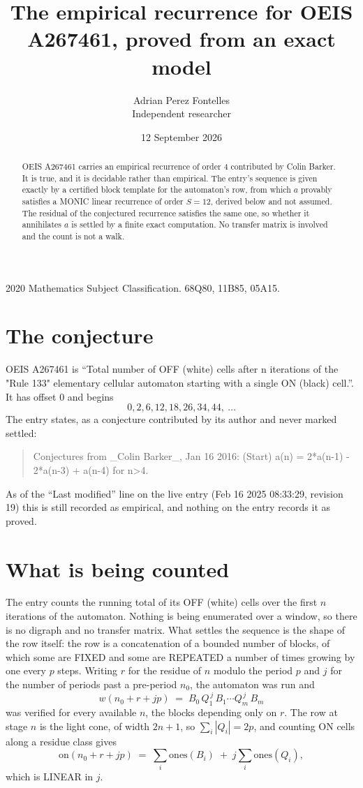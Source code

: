 \documentclass[11pt,a4paper]{article}
\title{The empirical recurrence for OEIS A267461, proved from an exact model}
\author{Adrian Perez Fontelles\\ \small Independent researcher}
\date{12 September 2026}
\theoremstyle{plain}
\theoremstyle{definition}
\begin{document}
\maketitle

\begin{abstract}
OEIS A267461 carries an empirical recurrence of order $4$ contributed by Colin Barker. It is true, and it is
decidable rather than empirical. The entry's sequence is given exactly by a certified block template for the automaton's row, from
which $a$ provably satisfies a MONIC linear recurrence of order $S=12$, derived below and not
assumed. The residual of the conjectured recurrence satisfies the same one, so whether it
annihilates $a$ is settled by a finite exact computation. No transfer matrix is involved and
the count is not a walk.
\end{abstract}

\noindent\small 2020 Mathematics Subject Classification. 68Q80, 11B85, 05A15.\normalsize

\section{The conjecture}

OEIS A267461 is ``Total number of OFF (white) cells after n iterations of the "Rule 133" elementary cellular automaton starting with a single ON (black) cell.''. It has offset $0$ and begins
\[
0, 2, 6, 12, 18, 26, 34, 44,\ \dots
\]
The entry states, as a conjecture contributed by its author and never marked settled:
\begin{quote}
Conjectures from \_Colin Barker\_, Jan 16 2016: (Start) a(n) = 2*a(n-1) - 2*a(n-3) + a(n-4) for n>4.
\end{quote}
As of the ``Last modified'' line on the live entry (Feb 16 2025 08:33:29, revision 19)
this is still recorded as empirical, and nothing on the entry records it as proved.

\section{What is being counted}

The entry counts the running total of its OFF (white) cells over the first $n$ iterations of the automaton. Nothing is being enumerated over a window, so there is
no digraph and no transfer matrix. What settles the sequence is the shape of the row itself:
the row is a concatenation of a bounded number of blocks, of which some are
FIXED and some are REPEATED a number of times growing by one every $p$ steps. Writing $r$ for
the residue of $n$ modulo the period $p$ and $j$ for the number of periods past a pre-period
$n_0$, the automaton was run and
\[
w(n_0 + r + jp)\;=\;B_0\,Q_1^{\,j}\,B_1\cdots Q_m^{\,j}\,B_m
\]
was verified for every available $n$, the blocks depending only on $r$. The
row at stage $n$ is the light cone, of width $2n+1$, so $\sum_i|Q_i|=2p$, and counting ON
cells along a residue class gives
\[
\mathrm{on}(n_0+r+jp)\;=\;\sum_i \mathrm{ones}(B_i)\;+\;j\sum_i \mathrm{ones}(Q_i),
\]
which is LINEAR in $j$.
\end{document}

